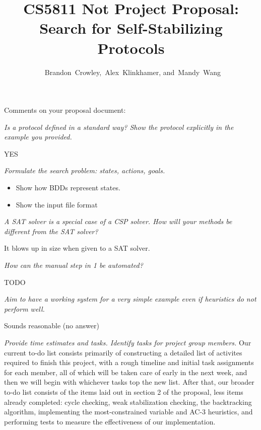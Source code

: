 


\usepackage{tikz}
\usetikzlibrary{arrows}


\title{
 CS5811 Not Project Proposal:\\
 Search for Self-Stabilizing Protocols
}

\author{~Brandon~Crowley,~Alex~Klinkhamer, and~Mandy~Wang}
\maketitle



Comments on your proposal document:

{\it Is a protocol defined in a standard way? Show the protocol explicitly in the example you provided.}

YES

{\it Formulate the search problem: states, actions, goals.
\begin{itemize}
\item Show how BDDs represent states.
\item Show the input file format
\end{itemize}
}

{\it A SAT solver is a special case of a CSP solver. How will your methods be different from the SAT solver?}

It blows up in size when given to a SAT solver.

{\it How can the manual step in 1 be automated?}

TODO

{\it Aim to have a working system for a very simple example even if heuristics do not perform well.}

Sounds reasonable (no answer)

{\it Provide time estimates and tasks. Identify tasks for project group members.}
Our current to-do list consists primarily of constructing a detailed list of activites required to finish this project, with a rough timeline 
and initial task assignments for each member, all of which will be taken care of early in the next week, and then we will begin with whichever tasks top
the new list.  After that, our broader to-do list consists of the items laid out in section 2 of the proposal, less items already completed:
cycle checking, weak stabilization checking, the backtracking algorithm, implementing the most-constrained variable and AC-3 heuristics, and performing
tests to measure the effectiveness of our implementation.

